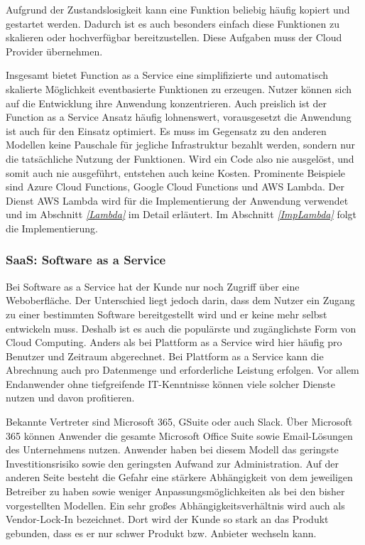    Aufgrund der Zustandslosigkeit kann eine Funktion beliebig häufig kopiert und gestartet werden.
   Dadurch ist es auch besonders einfach diese Funktionen zu skalieren oder hochverfügbar bereitzustellen.
   Diese Aufgaben muss der Cloud Provider übernehmen.

   Insgesamt bietet Function as a Service eine simplifizierte und automatisch skalierte Möglichkeit eventbasierte Funktionen zu erzeugen.
   Nutzer können sich auf die Entwicklung ihre Anwendung konzentrieren.
   Auch preislich ist der Function as a Service Ansatz häufig lohnenswert, vorausgesetzt die Anwendung ist auch für den Einsatz optimiert.
   Es muss im Gegensatz zu den anderen Modellen keine Pauschale für
   jegliche Infrastruktur bezahlt werden, sondern nur die tatsächliche Nutzung der Funktionen. Wird ein Code also nie ausgelöst, und somit auch nie ausgeführt,
   entstehen auch keine Kosten.
   Prominente Beispiele sind Azure Cloud Functions, Google Cloud Functions und AWS Lambda.
   Der Dienst AWS Lambda wird für die Implementierung der Anwendung verwendet und im Abschnitt \textit{\ref{Lambda} } im Detail erläutert.
   Im Abschnitt \textit{\ref{ImpLambda} } folgt die Implementierung.\cite{LambdaZitat}

   \subsubsection{SaaS: Software as a Service}
   Bei Software as a Service hat der Kunde nur noch Zugriff über eine Weboberfläche.
   Der Unterschied liegt jedoch darin, dass dem Nutzer ein Zugang zu einer bestimmten Software bereitgestellt wird und er keine mehr selbst entwickeln muss.
   Deshalb ist es auch die populärste und zugänglichste Form von Cloud Computing.
   Anders als bei Plattform as a Service wird hier häufig pro Benutzer und Zeitraum abgerechnet.
   Bei Plattform as a Service kann die Abrechnung auch pro Datenmenge und erforderliche Leistung erfolgen.
   Vor allem Endanwender ohne tiefgreifende IT-Kenntnisse können viele solcher Dienste nutzen und davon profitieren. \cite{SaaS}

   Bekannte Vertreter sind Microsoft 365, GSuite oder auch Slack.
   Über Microsoft 365 können Anwender die gesamte Microsoft Office Suite sowie Email-Lösungen des Unternehmens nutzen.
   Anwender haben bei diesem Modell das geringste Investitionsrisiko sowie den geringsten Aufwand zur Administration.
   Auf der anderen Seite besteht die Gefahr eine stärkere Abhängigkeit von dem jeweiligen Betreiber zu haben sowie weniger Anpassungsmöglichkeiten als bei den bisher vorgestellten Modellen.
   Ein sehr großes Abhängigkeitsverhältnis wird auch als Vendor-Lock-In bezeichnet. Dort wird der Kunde so stark an das Produkt gebunden, dass es er nur schwer Produkt bzw. Anbieter wechseln kann.




